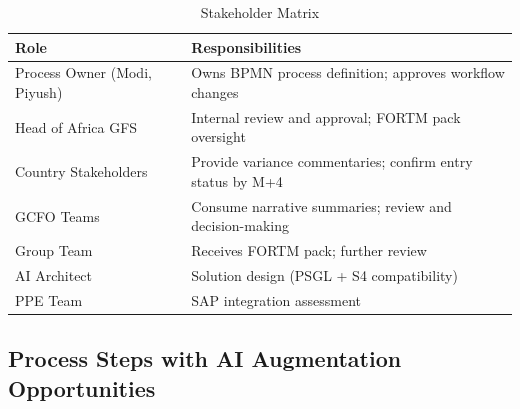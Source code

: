 \documentclass[11pt,a4paper]{article}
\begin{document}
\begin{table}[H]
\centering
\caption{Stakeholder Matrix}
\begin{tabularx}{\textwidth}{lX}
\toprule
\textbf{Role} & \textbf{Responsibilities} \\
\midrule
Process Owner (Modi, Piyush) & Owns BPMN process definition; approves workflow changes \\
Head of Africa GFS           & Internal review and approval; FORTM pack oversight \\
Country Stakeholders         & Provide variance commentaries; confirm entry status by M+4 \\
GCFO Teams                   & Consume narrative summaries; review and decision-making \\
Group Team                   & Receives FORTM pack; further review \\
AI Architect                 & Solution design (PSGL + S4 compatibility) \\
PPE Team                     & SAP integration assessment \\
\bottomrule
\end{tabularx}
\end{table}

\subsection{Process Steps with AI Augmentation Opportunities}
\end{document}

